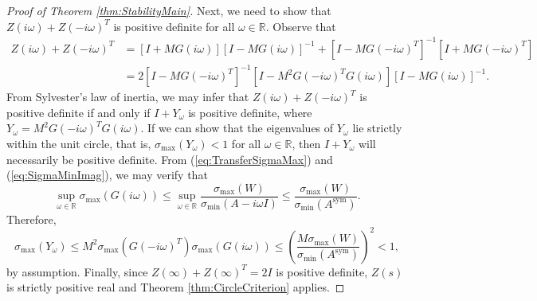 \documentclass{article} \usepackage{iclr2021_conference,times}
\newcommand{\sym}{\mathrm{sym}}
\begin{document}
\begin{proof}[Proof of Theorem \ref{thm:StabilityMain}]
Next, we need to show that $Z(i \omega) + Z(-i \omega)^T$ is positive definite for all $\omega \in \mathbb{R}$. Observe that
\begin{align*}
Z(i \omega) + Z(-i \omega)^T &= [I + M G(i \omega)][I - M G(i \omega)]^{-1}
+ [I - M G(-i \omega)^T]^{-1}[I + M G(-i \omega)^T] \\
&= 2[I - M G(-i \omega)^T]^{-1}[I - M^2 G(-i\omega)^T G(i\omega)][I - M G(i \omega)]^{-1}.
\end{align*}
From Sylvester's law of inertia, we may infer that $Z(i\omega) + Z(-i\omega)^T$ is positive definite if and only if $I + Y_\omega$ is positive definite, where $Y_\omega = M^2 G(-i\omega)^T G(i \omega)$. If we can show that the eigenvalues of $Y_\omega$ lie strictly within the unit circle, that is, $\sigma_{\max}(Y_\omega) < 1$ for all $\omega \in \mathbb{R}$, then $I + Y_\omega$ will necessarily be positive definite. From (\ref{eq:TransferSigmaMax}) and (\ref{eq:SigmaMinImag}), we may verify that
\[
\sup_{\omega \in \mathbb{R}} \sigma_{\max}(G(i\omega)) \leq \sup_{\omega \in \mathbb{R}} \frac{\sigma_{\max}(W)}{\sigma_{\min}(A - i \omega I)} \leq \frac{\sigma_{\max}(W)}{\sigma_{\min}(A^{\sym})}.
\]
Therefore,
\[
\sigma_{\max}(Y_\omega) \leq M^2 \sigma_{\max}(G(-i\omega)^T) \sigma_{\max}(G(i\omega)) \leq \left(\frac{M \sigma_{\max}(W)}{\sigma_{\min}(A^{\sym})}\right)^2 < 1,
\]
by assumption. Finally, since $Z(\infty) + Z(\infty)^T = 2I$ is positive definite, $Z(s)$ is strictly positive real and Theorem \ref{thm:CircleCriterion} applies. 


\end{proof}
\end{document}
